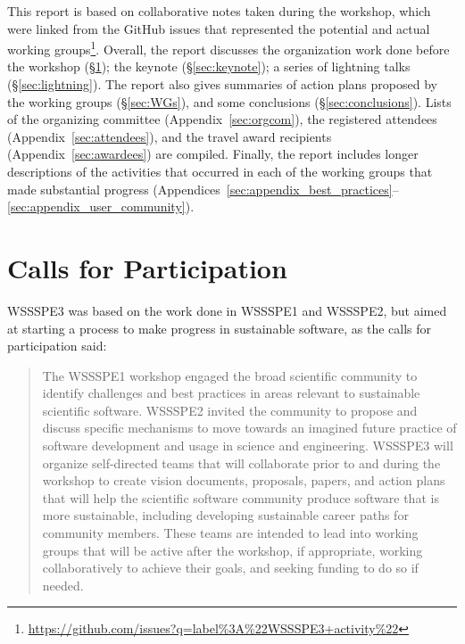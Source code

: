 \documentclass[11pt, oneside]{amsart}
\begin{document}
This report is based on collaborative notes taken during the workshop, which
were linked from the GitHub issues that represented the potential and actual
working
groups\footnote{\url{https://github.com/issues?q=label\%3A\%22WSSSPE3+activity\%22}}.
Overall, the report discusses the organization work done before the workshop
(\S\ref{sec:preworkshop}); the keynote (\S\ref{sec:keynote}); a series of
lightning talks (\S\ref{sec:lightning}). The report also gives summaries of
action plans proposed by the working groups (\S\ref{sec:WGs}), and some
conclusions (\S\ref{sec:conclusions}). Lists of the organizing committee
(Appendix~\ref{sec:orgcom}), the registered attendees
(Appendix~\ref{sec:attendees}), and the travel award recipients
(Appendix~\ref{sec:awardees}) are compiled. Finally, the report includes longer
descriptions of the activities that occurred in each of the working groups that
made substantial progress
(Appendices~\ref{sec:appendix_best_practices}--\ref{sec:appendix_user_community}).

\section{Calls for Participation} \label{sec:preworkshop}

WSSSPE3 was based on the work done in WSSSPE1 and WSSSPE2, but aimed at starting
a process to make progress in sustainable software, as the calls for
participation said:

\begin{quote} The WSSSPE1 workshop engaged the broad scientific community to
identify challenges and best practices in areas relevant to sustainable
scientific software. WSSSPE2 invited the community to propose and discuss
specific mechanisms to move towards an imagined future practice of software
development and usage in science and engineering. WSSSPE3 will organize
self-directed teams that will collaborate prior to and during the workshop to
create vision documents, proposals, papers, and action plans that will help the
scientific software community produce software that is more sustainable,
including developing sustainable career paths for community members. These teams
are intended to lead into working groups that will be active after the workshop,
if appropriate, working collaboratively to achieve their goals, and seeking
funding to do so if needed. \end{quote}
\end{document}

